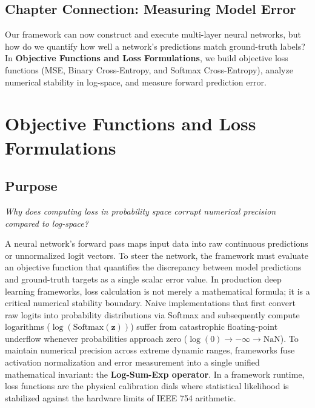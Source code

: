 \documentclass[
  letterpaper,
]{scrbook}
\begin{document}
\section{Chapter Connection: Measuring Model
Error}\label{chapter-connection-measuring-model-error}

Our framework can now construct and execute multi-layer neural networks,
but how do we quantify how well a network's predictions match
ground-truth labels? In \textbf{Objective Functions and Loss
Formulations}, we build objective loss functions (MSE, Binary
Cross-Entropy, and Softmax Cross-Entropy), analyze numerical stability
in log-space, and measure forward prediction error.

\chapter{Objective Functions and Loss
Formulations}\label{objective-functions-and-loss-formulations}

\section*{Purpose}\label{purpose-4}


\emph{Why does computing loss in probability space corrupt numerical
precision compared to log-space?}

A neural network's forward pass maps input data into raw continuous
predictions or unnormalized logit vectors. To steer the network, the
framework must evaluate an objective function that quantifies the
discrepancy between model predictions and ground-truth targets as a
single scalar error value. In production deep learning frameworks, loss
calculation is not merely a mathematical formula; it is a critical
numerical stability boundary. Naive implementations that first convert
raw logits into probability distributions via Softmax and subsequently
compute logarithms (\(\log(\text{Softmax}(\mathbf{z}))\)) suffer from
catastrophic floating-point underflow whenever probabilities approach
zero (\(\log(0) \to -\infty \to \text{NaN}\)). To maintain numerical
precision across extreme dynamic ranges, frameworks fuse activation
normalization and error measurement into a single unified mathematical
invariant: the \textbf{Log-Sum-Exp operator}. In a framework runtime,
loss functions are the physical calibration dials where statistical
likelihood is stabilized against the hardware limits of IEEE 754
arithmetic.
\end{document}
